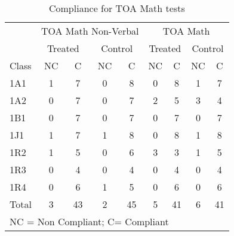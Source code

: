 \begin{table}[htbp]
  \centering
  \caption{Compliance for TOA Math tests}
    \begin{tabular}{lllllllll}
    \toprule
          & \multicolumn{4}{c}{TOA Math Non-Verbal} & \multicolumn{4}{c}{TOA Math} \\ \cmidrule(r){2-5} \cmidrule(r){6-9}
          & \multicolumn{2}{c}{Treated} & \multicolumn{2}{c}{Control} & \multicolumn{2}{c}{Treated} & \multicolumn{2}{c}{Control} \\ \cmidrule(r){2-3} \cmidrule(r){4-5} \cmidrule(r){6-7} \cmidrule(r){8-9}
    Class & \multicolumn{1}{c}{NC} & \multicolumn{1}{c}{C} & \multicolumn{1}{c}{NC} & \multicolumn{1}{c}{C} & \multicolumn{1}{c}{NC} & \multicolumn{1}{c}{C} & \multicolumn{1}{c}{NC} & \multicolumn{1}{c}{C} \\
    \midrule
    1A1   & \multicolumn{1}{c}{1} & \multicolumn{1}{c}{7} & \multicolumn{1}{c}{0} & \multicolumn{1}{c}{8} & \multicolumn{1}{c}{0} & \multicolumn{1}{c}{8} & \multicolumn{1}{c}{1} & \multicolumn{1}{c}{7} \\
    1A2   & \multicolumn{1}{c}{0} & \multicolumn{1}{c}{7} & \multicolumn{1}{c}{0} & \multicolumn{1}{c}{7} & \multicolumn{1}{c}{2} & \multicolumn{1}{c}{5} & \multicolumn{1}{c}{3} & \multicolumn{1}{c}{4} \\
    1B1   & \multicolumn{1}{c}{0} & \multicolumn{1}{c}{7} & \multicolumn{1}{c}{0} & \multicolumn{1}{c}{7} & \multicolumn{1}{c}{0} & \multicolumn{1}{c}{7} & \multicolumn{1}{c}{0} & \multicolumn{1}{c}{7} \\
    1J1   & \multicolumn{1}{c}{1} & \multicolumn{1}{c}{7} & \multicolumn{1}{c}{1} & \multicolumn{1}{c}{8} & \multicolumn{1}{c}{0} & \multicolumn{1}{c}{8} & \multicolumn{1}{c}{1} & \multicolumn{1}{c}{8} \\
    1R2   & \multicolumn{1}{c}{1} & \multicolumn{1}{c}{5} & \multicolumn{1}{c}{0} & \multicolumn{1}{c}{6} & \multicolumn{1}{c}{3} & \multicolumn{1}{c}{3} & \multicolumn{1}{c}{1} & \multicolumn{1}{c}{5} \\
    1R3   & \multicolumn{1}{c}{0} & \multicolumn{1}{c}{4} & \multicolumn{1}{c}{0} & \multicolumn{1}{c}{4} & \multicolumn{1}{c}{0} & \multicolumn{1}{c}{4} & \multicolumn{1}{c}{0} & \multicolumn{1}{c}{4} \\
    1R4   & \multicolumn{1}{c}{0} & \multicolumn{1}{c}{6} & \multicolumn{1}{c}{1} & \multicolumn{1}{c}{5} & \multicolumn{1}{c}{0} & \multicolumn{1}{c}{6} & \multicolumn{1}{c}{0} & \multicolumn{1}{c}{6} \\ \midrule
    Total & \multicolumn{1}{c}{3} & \multicolumn{1}{c}{43} & \multicolumn{1}{c}{2} & \multicolumn{1}{c}{45} & \multicolumn{1}{c}{5} & \multicolumn{1}{c}{41} & \multicolumn{1}{c}{6} & \multicolumn{1}{c}{41} \\
    \midrule
    \multicolumn{9}{l}{NC = Non Compliant; C= Compliant} \\
    \end{tabular}%
  \label{tab:compliance}%
\end{table}%

